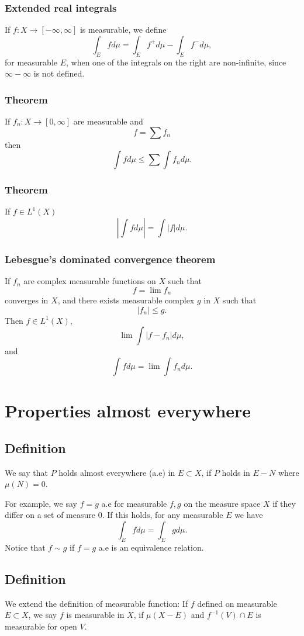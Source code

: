 \documentclass[oneside]{book}
\begin{document}
\subsection{Extended real integrals}
If $f:X\rightarrow [-\infty, \infty]$ is measurable,
we define
$$\int_E fd\mu = \int_E f^+d\mu - \int_E f^-d\mu,$$
for measurable $E$, when one of the integrals on the right
are non-infinite, since $\infty-\infty$ is not defined.

\subsection{Theorem}\label{series}
If $f_n: X\rightarrow [0,\infty]$ are measurable  and
$$f=\sum f_n$$
then
$$\int fd\mu \leq \sum \int f_n d\mu.$$

\subsection{Theorem}\label{intfbounded}
If $f\in L^1(X)$
$$\left|\int fd\mu\right| = \int |f|d\mu.$$

\subsection{Lebesgue's dominated convergence theorem}\label{dominated}
If $f_n$ are complex measurable functions on $X$ such that
$$f=\lim f_n$$
converges in $X$, and there exists measurable complex $g$ in $X$
such that
$$|f_n|\leq g.$$
Then $f\in L^1(X)$,
$$\lim \int |f-f_n| d \mu,$$
and
$$\int f d\mu = \lim \int f_n d\mu.$$

\chapter{Properties almost everywhere}
\section{Definition}
We say that $P$ holds almost everywhere (a.e) in $E\subset X$, if
$P$ holds in $E-N$ where $\mu(N)=0$.

For example, we say $f=g$ a.e for measurable $f,g$
on the measure space $X$ if they differ on a set of measure $0$.
If this holds, for any measurable $E$ we have
$$\int_E fd\mu =\int_E gd\mu.$$
Notice that $f\sim g$ if $f=g$ a.e is an equivalence relation.

\section{Definition}
We extend the definition of measurable function: If $f$ defined on
measurable $E\subset X$, we say $f$ is measurable in $X$,
if $\mu(X-E)$ and $f^{-1}(V)\cap E$ is measurable
for open $V$.
\end{document}
